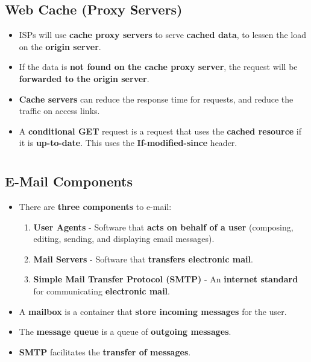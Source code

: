 \documentclass[16pt]{article}
\begin{document}
    \subsection*{Web Cache (Proxy Servers)}
    \begin{itemize}
        \item ISPs will use \textbf{cache proxy servers} to serve \textbf{cached data}, to lessen the load on the \textbf{origin server}.
        \item If the data is \textbf{not found on the cache proxy server}, the request will be \textbf{forwarded to the origin server}.
        \item \textbf{Cache servers} can reduce the response time for requests, and reduce the traffic on access links.
        \item A \textbf{conditional GET} request is a request that uses the \textbf{cached resource} if it is \textbf{up-to-date}. This uses the \textbf{If-modified-since} header.
    \end{itemize}

    \section*{}

    \subsection*{E-Mail Components}
    \begin{itemize}
        \item There are \textbf{three components} to e-mail:
        \begin{enumerate}
            \item \textbf{User Agents} - Software that \textbf{acts on behalf of a user} (composing, editing, sending, and displaying email messages).
            \item \textbf{Mail Servers} - Software that \textbf{transfers electronic mail}.
            \item \textbf{Simple Mail Transfer Protocol (SMTP)} - An \textbf{internet standard} for communicating \textbf{electronic mail}.
        \end{enumerate}
        \item A \textbf{mailbox} is a container that \textbf{store incoming messages} for the user.
        \item The \textbf{message queue} is a queue of \textbf{outgoing messages}.
        \item \textbf{SMTP} facilitates the \textbf{transfer of messages}.
    \end{itemize}
\end{document}
